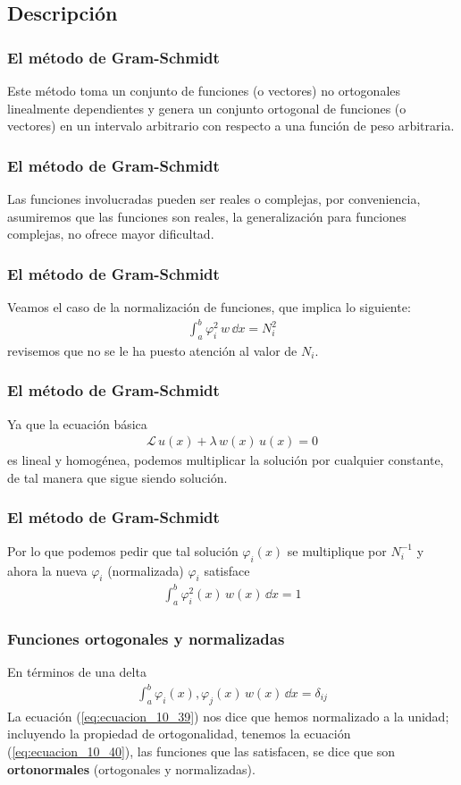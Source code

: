 \subsection{Descripción}
\begin{frame}
\frametitle{El método de Gram-Schmidt}
Este método toma un conjunto de funciones (o vectores) no ortogonales linealmente dependientes y genera un conjunto ortogonal de funciones (o vectores) en un intervalo arbitrario con respecto a una función de peso arbitraria.
\end{frame}
\begin{frame}
\frametitle{El método de Gram-Schmidt}
Las funciones involucradas pueden ser reales o complejas, por conveniencia, asumiremos que las funciones son reales, la generalización para funciones complejas, no ofrece mayor dificultad.
\end{frame}
\begin{frame}
\frametitle{El método de Gram-Schmidt}
Veamos el caso de la normalización de funciones, que implica lo siguiente:
\begin{align*}
\int_{a}^{b} \varphi_{i}^{2} \, w \, \dd{x}  =  N_{i}^{2}
\end{align*}
revisemos que no se le ha puesto atención al valor de $N_{i}$.
\end{frame}
\begin{frame}
\frametitle{El método de Gram-Schmidt}
Ya que la ecuación básica 
\begin{align}
\mathcal{L} \, u(x) + \lambda \, w(x) \, u(x) = 0
\label{eq:ecuacion_10_08}
\end{align}
es lineal y homogénea, podemos multiplicar la solución por cualquier constante, de tal manera que sigue siendo solución.
\end{frame}
\begin{frame}
\frametitle{El método de Gram-Schmidt}
Por lo que podemos pedir que tal solución $\varphi_{i}(x)$ se multiplique por $N_{i}^{-1}$ y ahora la nueva $\varphi_{i}$ (normalizada) $\varphi_{i}$ satisface
\begin{align}
\int_{a}^{b} \varphi_{i}^{2} (x) \, w(x) \, \dd{x} = 1
\label{eq:ecuacion_10_39}
\end{align}
\end{frame}
\begin{frame}
\frametitle{Funciones ortogonales y normalizadas}
En términos de una delta
\begin{align}
\int_{a}^{b} \varphi_{i}(x) , \varphi_{j} (x) \, w(x) \, \dd{x} = \delta_{ij}
\label{eq:ecuacion_10_40}
\end{align}
La ecuación (\ref{eq:ecuacion_10_39}) nos dice que hemos normalizado a la unidad; incluyendo la propiedad de ortogonalidad, tenemos la ecuación (\ref{eq:ecuacion_10_40}), las funciones que las satisfacen, se dice que son \textbf{ortonormales} (ortogonales y normalizadas).
\end{frame}
